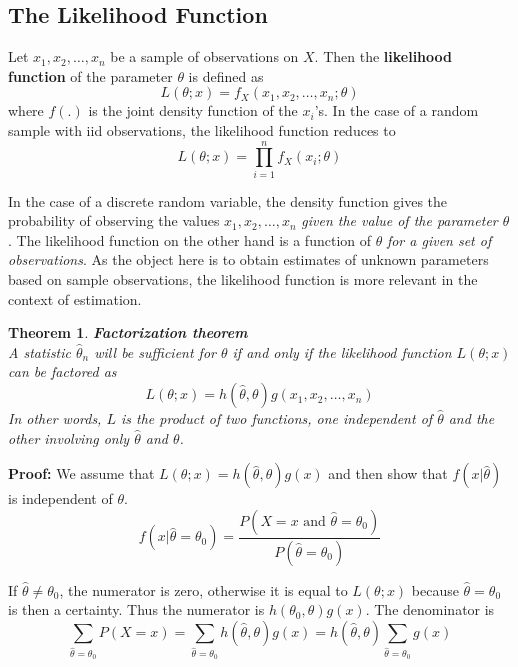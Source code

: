 \documentclass{article}
\newtheorem{theorem}{Theorem}[section]
\begin{document}
\subsection{The Likelihood Function}

Let \(x_1,x_2,\dots,x_n\) be a sample of observations on \(X\). Then the \textbf{likelihood function} of the parameter \(\theta\) is defined as
\begin{equation*}
    L(\theta;x)=f_X(x_1,x_2,\dots,x_n;\theta)
\end{equation*}
where \(f(.)\) is the joint density function of the \(x_i\)'s. In the case of a random sample with iid observations, the likelihood function reduces to
\begin{equation*}
    L(\theta;x)=\prod_{i=1}^{n} f_X(x_i;\theta)
\end{equation*}

In the case of a discrete random variable, the density function gives the probability of observing the values \(x_1,x_2,\dots,x_n\) \textit{given the value of the parameter \(\theta\)}. The likelihood function on the other hand is a function of \(\theta\) \textit{for a given set of observations}. As the object here is to obtain estimates of unknown parameters based on sample observations, the likelihood function is more relevant in the context of estimation.

\begin{theorem}
    \textbf{Factorization theorem}\\
    
    A statistic \(\hat{\theta}_n\) will be sufficient for \(\theta\) if and only if the likelihood function \(L(\theta;x)\) can be factored as
    \begin{equation*}
    L(\theta;x)=h(\hat{\theta},\theta)g(x_1,x_2,\dots,x_n)
    \end{equation*}
    In other words, \(L\) is the product of two functions, one independent of \(\hat{\theta}\) and the other involving only \(\hat{\theta}\) and \(\theta\).
\end{theorem}

\textbf{Proof:} We assume that \(L(\theta;x)=h(\hat{\theta},\theta)g(x)\) and then show that \(f(x|\hat{\theta})\) is independent of \(\theta\).
\begin{equation*}
    f(x|\hat{\theta}=\theta_0)=\frac{P(X=x \text{ and } \hat{\theta}=\theta_0)}{P(\hat{\theta}=\theta_0)}
\end{equation*}

If \(\hat{\theta} \neq \theta_0\), the numerator is zero, otherwise it is equal to \(L(\theta;x)\) because \(\hat{\theta}=\theta_0\) is then a certainty. Thus the numerator is \(h(\theta_0,\theta)g(x)\). The denominator is
\begin{equation*}
\sum_{\hat{\theta}=\theta_0}P(X=x)=\sum_{\hat{\theta}=\theta_0} h(\hat{\theta},\theta)g(x)=h(\hat{\theta},\theta) \sum_{\hat{\theta}=\theta_0} g(x)
\end{equation*}
\end{document}
